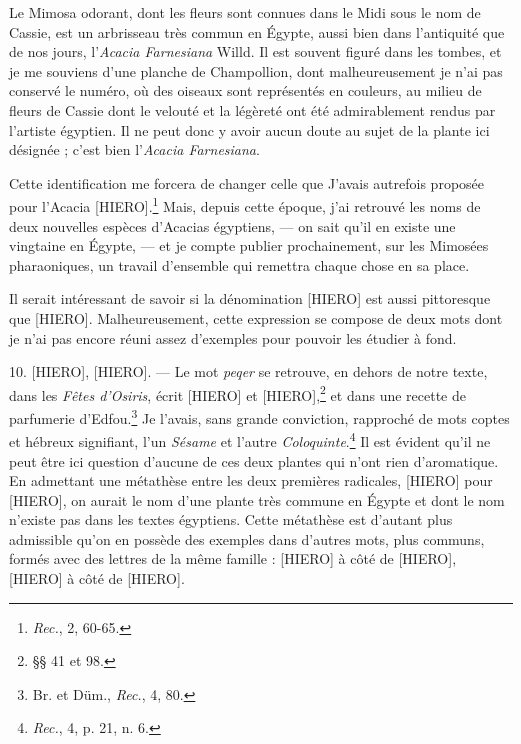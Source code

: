 \documentclass[a4paper, 11pt, oneside]{article}
\begin{document}
Le Mimosa odorant, dont les fleurs sont connues dans le Midi sous le nom de Cassie, est un arbrisseau très commun en Égypte, aussi bien dans l'antiquité que de nos jours, l'\emph{Acacia Farnesiana} Willd. Il est souvent figuré dans les tombes, et je me souviens d'une planche de Champollion, dont malheureusement je n'ai pas conservé le numéro, où des oiseaux sont représentés en couleurs, au milieu de fleurs de Cassie dont le velouté et la légèreté ont été admirablement rendus par l'artiste égyptien. Il ne peut donc y avoir aucun doute au sujet de la plante ici désignée ; c'est bien l'\emph{Acacia Farnesiana}.

Cette identification me forcera de changer celle que J'avais autrefois proposée pour l'Acacia [HIERO].\footnote{\emph{Rec.}, 2, 60-65.} Mais, depuis cette époque, j'ai retrouvé les noms de deux nouvelles espèces d'Acacias égyptiens, --- on sait qu'il en existe une vingtaine en Égypte, --- et je compte publier prochainement, sur les Mimosées pharaoniques, un travail d'ensemble qui remettra chaque chose en sa place.

Il serait intéressant de savoir si la dénomination [HIERO] est aussi pittoresque que [HIERO]. Malheureusement, cette expression se compose de deux mots dont je n'ai pas encore réuni assez d'exemples pour pouvoir les étudier à fond.

10. [HIERO], [HIERO]. --- Le mot \emph{peqer} se retrouve, en dehors de notre texte, dans les \emph{Fêtes d'Osiris}, écrit [HIERO] et [HIERO],\footnote{§§ 41 et 98.} et dans une recette de parfumerie d'Edfou.\footnote{Br. et Düm., \emph{Rec.}, 4, 80.} Je l'avais, sans grande conviction, rapproché de mots coptes et hébreux signifiant, l'un \emph{Sésame} et l'autre \emph{Coloquinte}.\footnote{\emph{Rec.}, 4, p. 21, n. 6.} Il est évident qu'il ne peut être ici question d'aucune de ces deux plantes qui n'ont rien d'aromatique. En admettant une métathèse entre les deux premières radicales, [HIERO] pour [HIERO], on aurait le nom d'une plante très commune en Égypte et dont le nom n'existe pas dans les textes égyptiens. Cette métathèse est d'autant plus admissible qu'on en possède des exemples dans d'autres mots, plus communs, formés avec des lettres de la même famille : [HIERO] à côté de [HIERO], [HIERO] à côté de [HIERO].

\end{document}
